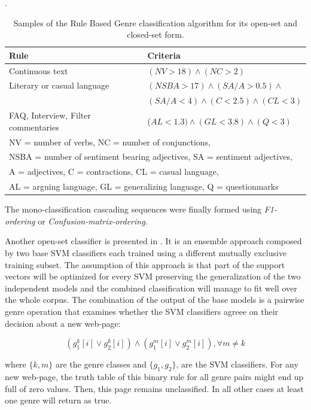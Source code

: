 \begin{itemize}
\begin{end}
\begin{table}[t]
	\center
	\caption{Samples of the Rule Based Genre classification algorithm for its open-set and closed-set form.}\label{chap:relevant_work:tbl:stubbe_alg_rules}.
	\begin{tabular}{|l|l|}
		\hline
		Rule & Criteria \\
		\hline
		Continuous text & $(NV > 18) \wedge (NC > 2)$\\
		Literary or casual language & $(NSBA > 17) \wedge (SA/A > 0.5) \wedge$\\ 
		& $(SA/A < 4) \wedge (C < 2.5) \wedge (CL < 3)$\\
		FAQ, Interview, Filter commentaries &($AL < 1.3) \wedge (GL < 3.8) \wedge (Q < 3)$\\
		\hline
		\multicolumn{2}{|l|}{NV = number of verbs, NC = number of conjunctions,}\\
		\multicolumn{2}{|l|}{NSBA = number of sentiment bearing adjectives, SA = sentiment adjectives,}\\
		\multicolumn{2}{|l|}{A = adjectives, C = contractions, CL = casual language,}\\
		\multicolumn{2}{|l|}{AL = arguing language, GL = generalizing language, Q = questionmarks}\\
		\hline
	\end{tabular}
\end{table}

The mono-classification cascading sequences were finally formed using \textit{F1-ordering} or \textit{Confusion-matrix-ordering}. 


Another open-set classifier is presented in \parencite{chen2012genre}. It is an ensemble approach composed by two base SVM classifiers each trained using a different mutually exclusive training subset. The assumption of this approach is that part of the support vectors will be optimized for every SVM preserving the generalization of the two independent models and the combined classification will manage to fit well over the whole corpus. The combination of the output of the base models is a pairwise genre operation that examines whether the SVM classifiers agreee on their decision about a new web-page:

\begin{equation}\label{eq:office_doc_ensemble}
	(g^{k}_{1}[i] \vee g^{k}_{2}[i])  \wedge  (g^{m}_{1}[i] \vee g^{m}_{2}[i]) ,   \forall m \neq k
\end{equation}

where $\{k, m\}$ are the genre classes and $\{g_{1}, g_{2}\}$, are the SVM classifiers. For any new web-page, the truth table of this binary rule for all genre pairs might end up full of zero values. Then, this page remains unclassified. In all other cases at least one genre will return as true. 
		

\end{end}
\end{itemize}
